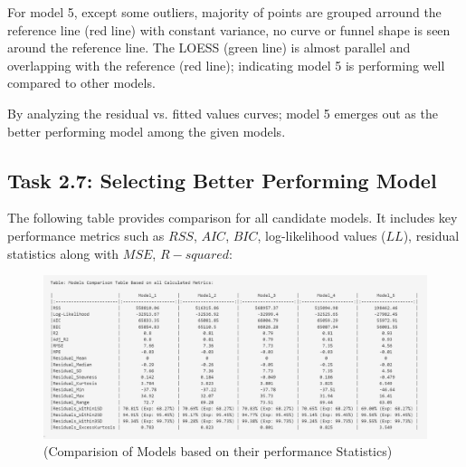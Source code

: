 \documentclass[12pt,a4paper]{article}
\begin{document}

For model 5, except some outliers, majority of 
points are grouped arround the reference line 
(red line) with constant variance, no curve or 
funnel shape is seen around the reference line. 
The LOESS (green line) is almost parallel and 
overlapping with the reference (red line); 
indicating model 5 is performing well compared to other models.

By analyzing the residual vs. fitted values curves; 
model 5 emerges out as the better performing model among the given models. 


\subsection*{Task 2.7: Selecting Better Performing Model}

The following table provides comparison for all 
candidate models. It includes key performance metrics such as $RSS$, $AIC$, 
$BIC$, log-likelihood values ($LL$), residual statistics along with $MSE$, $R-squared$:

\begin{figure}[H]
  \centering
  \includegraphics[width=\textwidth]{y12.png}
  \caption{(Comparision of Models based on their performance Statistics)}
  \label{fig:Model Selection}
\end{figure}

\end{document}
